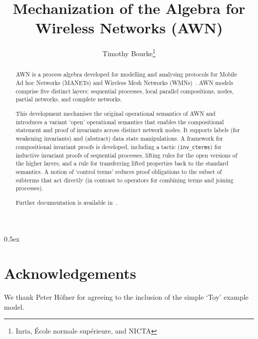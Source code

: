 \documentclass[11pt,a4paper]{article}
\begin{document}
\title{Mechanization of the Algebra for Wireless Networks (AWN)}
\author{Timothy Bourke\thanks{Inria, \'Ecole normale sup\'erieure, and 
NICTA}}
\maketitle

\begin{abstract}
AWN is a process algebra developed for modelling and analysing protocols for 
Mobile Ad hoc Networks (MANETs) and Wireless Mesh Networks 
(WMNs)~\cite[]{FehnkerEtAl:AWN:2013}.
AWN models comprise five distinct layers: sequential processes, local 
parallel compositions, nodes, partial networks, and complete networks.

This development mechanises the original operational semantics of AWN and 
introduces a variant `open' operational semantics that enables the 
compositional statement and proof of invariants across distinct network 
nodes.
It supports labels (for weakening invariants) and (abstract) data state 
manipulations.
A framework for compositional invariant proofs is developed, including a 
tactic (\verb|inv_cterms|) for inductive invariant proofs of sequential 
processes, lifting rules for the open versions of the higher layers, and a 
rule for transferring lifted properties back to the standard semantics.
A notion of `control terms' reduces proof obligations to the subset of 
subterms that act directly (in contrast to operators for combining terms and 
joining processes).

Further documentation is available in~\cite{BourkeEtAl:MechAWN:2014}.

\end{abstract}

\tableofcontents

\parindent 0pt\parskip 0.5ex



\section{Acknowledgements}

We thank Peter H\"ofner for agreeing to the inclusion of the simple `Toy' 
example model.



\end{document}
